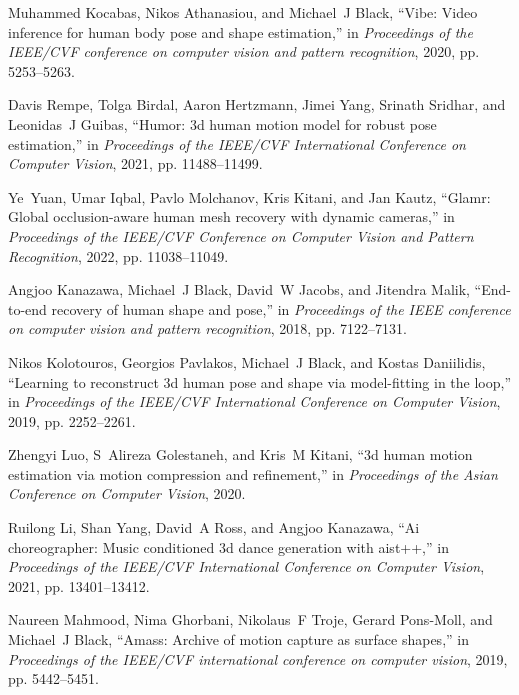 \documentclass{svproc}
\begin{document}
\begin{thebibliography}{10}

Muhammed Kocabas, Nikos Athanasiou, and Michael~J Black,
\newblock ``Vibe: Video inference for human body pose and shape estimation,''
\newblock in {\em Proceedings of the IEEE/CVF conference on computer vision and
  pattern recognition}, 2020, pp. 5253--5263.

Davis Rempe, Tolga Birdal, Aaron Hertzmann, Jimei Yang, Srinath Sridhar, and
  Leonidas~J Guibas,
\newblock ``Humor: 3d human motion model for robust pose estimation,''
\newblock in {\em Proceedings of the IEEE/CVF International Conference on
  Computer Vision}, 2021, pp. 11488--11499.

Ye~Yuan, Umar Iqbal, Pavlo Molchanov, Kris Kitani, and Jan Kautz,
\newblock ``Glamr: Global occlusion-aware human mesh recovery with dynamic
  cameras,''
\newblock in {\em Proceedings of the IEEE/CVF Conference on Computer Vision and
  Pattern Recognition}, 2022, pp. 11038--11049.

Angjoo Kanazawa, Michael~J Black, David~W Jacobs, and Jitendra Malik,
\newblock ``End-to-end recovery of human shape and pose,''
\newblock in {\em Proceedings of the IEEE conference on computer vision and
  pattern recognition}, 2018, pp. 7122--7131.

Nikos Kolotouros, Georgios Pavlakos, Michael~J Black, and Kostas Daniilidis,
\newblock ``Learning to reconstruct 3d human pose and shape via model-fitting
  in the loop,''
\newblock in {\em Proceedings of the IEEE/CVF International Conference on
  Computer Vision}, 2019, pp. 2252--2261.

Zhengyi Luo, S~Alireza Golestaneh, and Kris~M Kitani,
\newblock ``3d human motion estimation via motion compression and refinement,''
\newblock in {\em Proceedings of the Asian Conference on Computer Vision},
  2020.

Ruilong Li, Shan Yang, David~A Ross, and Angjoo Kanazawa,
\newblock ``Ai choreographer: Music conditioned 3d dance generation with
  aist++,''
\newblock in {\em Proceedings of the IEEE/CVF International Conference on
  Computer Vision}, 2021, pp. 13401--13412.

Naureen Mahmood, Nima Ghorbani, Nikolaus~F Troje, Gerard Pons-Moll, and
  Michael~J Black,
\newblock ``Amass: Archive of motion capture as surface shapes,''
\newblock in {\em Proceedings of the IEEE/CVF international conference on
  computer vision}, 2019, pp. 5442--5451.


\end{thebibliography}
\end{document}
